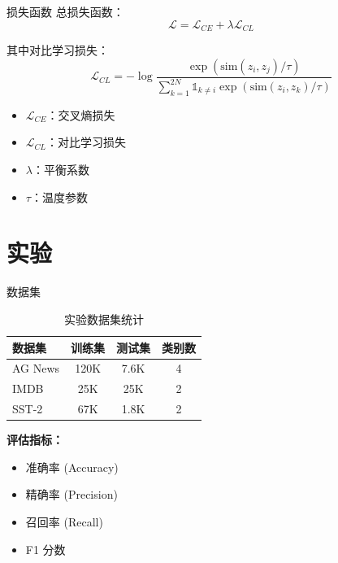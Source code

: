 \documentclass[aspectratio=169]{beamer}
\begin{document}
\begin{frame}{损失函数}
  总损失函数：
  \begin{equation}
    \mathcal{L} = \mathcal{L}_{CE} + \lambda \mathcal{L}_{CL}
  \end{equation}

  其中对比学习损失：
  \begin{equation}
    \mathcal{L}_{CL} = -\log \frac{\exp(\text{sim}(z_i, z_j) / \tau)}{\sum_{k=1}^{2N} \mathbb{1}_{k \neq i} \exp(\text{sim}(z_i, z_k) / \tau)}
  \end{equation}

  \vspace{0.5em}
  \begin{itemize}
    \item $\mathcal{L}_{CE}$：交叉熵损失
    \item $\mathcal{L}_{CL}$：对比学习损失
    \item $\lambda$：平衡系数
    \item $\tau$：温度参数
  \end{itemize}
\end{frame}

\section{实验}

\begin{frame}{数据集}
  \begin{table}
    \centering
    \begin{tabular}{lccc}
      \toprule
      数据集 & 训练集 & 测试集 & 类别数 \\
      \midrule
      AG News & 120K & 7.6K & 4 \\
      IMDB & 25K & 25K & 2 \\
      SST-2 & 67K & 1.8K & 2 \\
      \bottomrule
    \end{tabular}
    \caption{实验数据集统计}
  \end{table}

  \vspace{1em}
  \textbf{评估指标：}
  \begin{itemize}
    \item 准确率 (Accuracy)
    \item 精确率 (Precision)
    \item 召回率 (Recall)
    \item F1 分数
  \end{itemize}
\end{frame}
\end{document}
